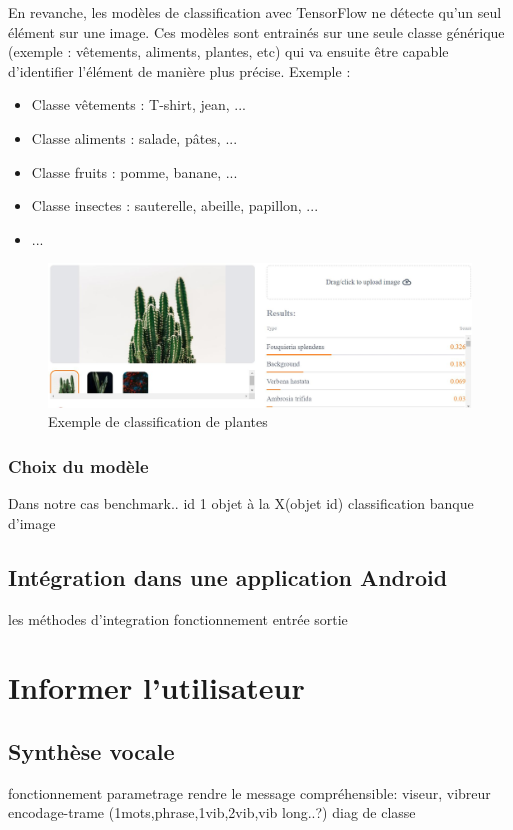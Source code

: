 \documentclass[UTF8]{EPURapport}
\begin{document}
En revanche, les modèles de classification avec TensorFlow ne détecte qu'un seul élément sur une image. Ces modèles sont entrainés sur une seule classe générique (exemple : vêtements, aliments, plantes, etc) qui va ensuite être capable d'identifier l'élément de manière plus précise. Exemple : \\

\begin{itemize}
  \item Classe vêtements : T-shirt, jean, ...
  \item Classe aliments : salade, pâtes, ...
  \item Classe fruits : pomme, banane, ...  
  \item Classe insectes : sauterelle, abeille, papillon, ...
  \item  ...
\end{itemize}

\begin{figure}[h!]
\centering
  \includegraphics[width=\textwidth]{images/plants_classification.jpg}
  \caption{Exemple de classification de plantes}
  \label{fig:plantsclassification}
\end{figure}

\subsubsection{Choix du modèle}

Dans notre cas 
benchmark..
id 1 objet à la X(objet id)
classification
banque d'image
\subsection{Intégration dans une application Android}
les méthodes d'integration
fonctionnement
entrée sortie

\section{Informer l'utilisateur}
\subsection{Synthèse vocale}
fonctionnement
parametrage
rendre le message compréhensible: viseur,
vibreur
encodage-trame (1mots,phrase,1vib,2vib,vib long..?)
diag de classe
\end{document}

